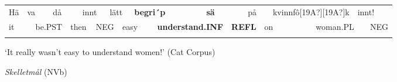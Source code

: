 \begin{tabular}{llllllllllllllllllll}
\lsptoprule
Hä & \multicolumn{2}{l}{va

} & \multicolumn{2}{l}{då

} & \multicolumn{2}{l}{innt

} & \multicolumn{2}{l}{lätt

} & \multicolumn{2}{l}{{\bfseries begri´p}

} & \multicolumn{2}{l}{{\bfseries sä}

} & \multicolumn{2}{l}{på

} & \multicolumn{2}{l}{kvinnfô[19A?][19A?]k

} & \multicolumn{2}{l}{innt!

} & \\
\multicolumn{2}{l}{it

} & \multicolumn{2}{l}{be.PST

} & \multicolumn{2}{l}{then

} & \multicolumn{2}{l}{NEG

} & \multicolumn{2}{l}{easy

} & \multicolumn{2}{l}{{\bfseries understand.INF}

} & \multicolumn{2}{l}{{\bfseries REFL}

} & \multicolumn{2}{l}{on

} & \multicolumn{2}{l}{woman.PL

} & \multicolumn{2}{l}{NEG

}\\
\lspbottomrule
\end{tabular}

\begin{styleTranslation}
‘It really wasn’t easy to understand women!’ (Cat Corpus)

\end{styleTranslation}

\begin{listWWNumileveli}
\item 

\begin{styleExample}
\textit{Skelletmål} (NVb)

\end{styleExample}

\end{listWWNumileveli}

